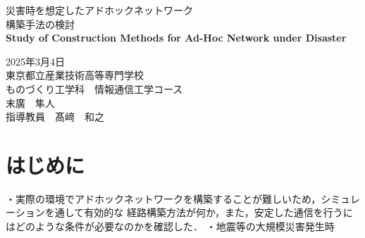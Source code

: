 \documentclass[a4paper, 11pt]{ltjsarticle}
\begin{document}
\fontsize{11pt}{14pt}\selectfont

\thispagestyle{empty}
\begin{center}

\vspace*{40mm}
{\huge\noindent 災害時を想定したアドホックネットワーク}\\
\medskip
{\huge\noindent 構築手法の検討}\\
\vspace{\baselineskip}
{\huge\noindent\textbf{Study of Construction Methods for Ad-Hoc Network under Disaster}}\\
\vspace{120mm}

{\huge\noindent
2025年3月4日\\
東京都立産業技術高等専門学校\\
ものづくり工学科　情報通信工学コース \\
末廣　隼人\\
指導教員　髙﨑　和之    \\
}
\vspace{40mm}

\end{center}

\clearpage  %
\thispagestyle{empty}
\tableofcontents  %

\clearpage
{}
\section{はじめに}

・実際の環境でアドホックネットワークを構築することが難しいため，シミュレーションを通して有効的な
経路構築方法が何か，また，安定した通信を行うにはどのような条件が必要なのかを確認した．
・地震等の大規模災害発生時
\end{document}
